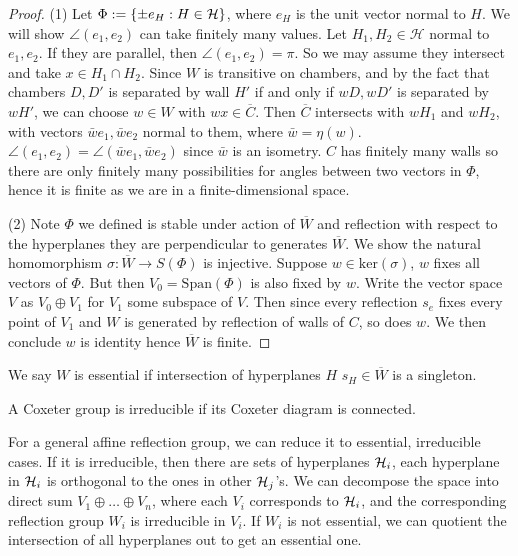 \documentclass[../main.tex]{subfiles}
\begin{document}
\begin{proof}
    (1) Let $\Phi := \{\pm e_H:H\in \mathcal{H}\}$, where $e_H$ is the unit vector normal to $H$. We will show $\angle(e_1,e_2)$ can take finitely many values. Let $H_1,H_2 \in \mathcal H$ normal to $e_1,e_2$. If they are parallel, then $\angle(e_1,e_2)=\pi$. So we may assume they intersect and take $x\in H_1\cap H_2$. Since $W$ is transitive on chambers, and by the fact that chambers $D,D'$ is separated by wall $H'$ if and only if $wD,wD'$ is separated by $wH'$, we can choose $w \in W$ with $wx\in \overline C$. Then $\overline C$ intersects with $wH_1$ and $wH_2$, with vectors $\bar we_1,\bar we_2$ normal to them, where $\bar w=\eta(w)$. $\angle(e_1,e_2)=\angle(\bar we_1,\bar we_2)$ since $\bar w$ is an isometry. $C$ has finitely many walls so there are only finitely many possibilities for angles between two vectors in $\Phi$, hence it is finite as we are in a finite-dimensional space.

    (2) Note $\Phi$ we defined is stable under action of $\overline W$ and reflection with respect to the hyperplanes they are perpendicular to generates $\overline W$. We show the natural homomorphism $\sigma:\overline W \rightarrow S(\Phi)$ is injective. Suppose $w\in \text{ker}(\sigma)$, $w$ fixes all vectors of $\Phi$. But then $V_0=\text{Span}(\Phi)$ is also fixed by $w$. Write the vector space $V$ as $V_0\oplus V_1$ for $V_1$ some subspace of $V$. Then since every reflection $s_e$ fixes every point of $V_1$ and $W$ is generated by reflection of walls of $C$, so does $w$. We then conclude $w$ is identity hence $\overline W$ is finite.
\end{proof}

\begin{definition}
    We say $W$ is essential if intersection of hyperplanes $H$ $s_H \in \overline W$ is a singleton.
\end{definition}

\begin{definition}
    A Coxeter group is irreducible if its Coxeter diagram is connected.
\end{definition}

For a general affine reflection group, we can reduce it to essential, irreducible cases. If it is irreducible, then there are sets of hyperplanes $\mathcal{H}_i$, each hyperplane in $\mathcal{H}_i$ is orthogonal to the ones in other $\mathcal{H}_j$'s. We can decompose the space into direct sum $V_1 \oplus \dots \oplus V_n$, where each $V_i$ corresponds to $\mathcal{H}_i$, and the corresponding reflection group $W_i$ is irreducible in $V_i$. If $W_i$ is not essential, we can quotient the intersection of all hyperplanes out to get an essential one.
\end{document}
